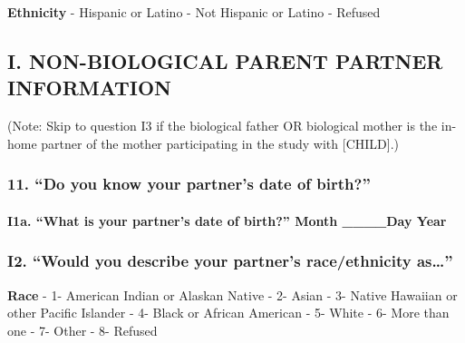\documentclass[
  12pt,
]{book}
\begin{document}
\textbf{Ethnicity}
- Hispanic or Latino
- Not Hispanic or Latino
- Refused

\hypertarget{i.-non-biological-parent-partner-information}{%
\subsection*{I. NON-BIOLOGICAL PARENT PARTNER INFORMATION}\label{i.-non-biological-parent-partner-information}}

(Note: Skip to question I3 if the biological father OR biological mother is the in-home partner of the mother participating in the study with {[}CHILD{]}.)

\hypertarget{do-you-know-your-partners-date-of-birth}{%
\subsubsection*{11. ``Do you know your partner's date of birth?''}\label{do-you-know-your-partners-date-of-birth}}

\hypertarget{i1a.-what-is-your-partners-date-of-birth-month-____day-year}{%
\paragraph*{I1a. ``What is your partner's date of birth?'' Month \_\_\_\_Day Year}\label{i1a.-what-is-your-partners-date-of-birth-month-____day-year}}

\hypertarget{i2.-would-you-describe-your-partners-raceethnicity-as}{%
\subsubsection*{\texorpdfstring{I2. ``Would you describe your partner's race/ethnicity as\ldots{}''}{I2. ``Would you describe your partner's race/ethnicity as\ldots''}}\label{i2.-would-you-describe-your-partners-raceethnicity-as}}

\textbf{Race}
- 1- American Indian or Alaskan Native
- 2- Asian
- 3- Native Hawaiian or other Pacific Islander
- 4- Black or African American
- 5- White
- 6- More than one
- 7- Other
- 8- Refused
\end{document}
